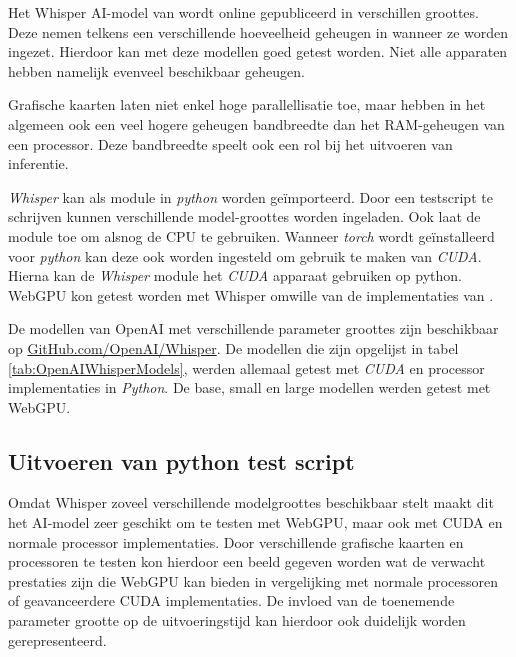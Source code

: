 Het Whisper AI-model van \textcite{OpenAI2023} wordt online gepubliceerd in verschillen groottes. Deze nemen telkens een verschillende hoeveelheid geheugen in wanneer ze worden ingezet. Hierdoor kan met deze modellen goed getest worden. Niet alle apparaten hebben namelijk evenveel beschikbaar geheugen. 

\bigbreak{}

Grafische kaarten laten niet enkel hoge parallellisatie toe, maar hebben in het algemeen ook een veel hogere geheugen bandbreedte dan het RAM-geheugen van een processor. Deze bandbreedte speelt ook een rol bij het uitvoeren van inferentie.

\bigbreak{}

\textit{Whisper} kan als module in \textit{python} worden geïmporteerd. Door een testscript te schrijven kunnen verschillende model-groottes worden ingeladen. Ook laat de module toe om alsnog de CPU te gebruiken. Wanneer \textit{torch} wordt geïnstalleerd voor \textit{python} kan deze ook worden ingesteld om gebruik te maken van \textit{CUDA}. Hierna kan de \textit{Whisper} module het \textit{CUDA} apparaat gebruiken op python. WebGPU kon getest worden met Whisper omwille van de implementaties van \textcite{Fleetwood2024, Fleetwood2023b}.

\bigbreak{}

De modellen van OpenAI met verschillende parameter groottes zijn beschikbaar op \href{https://github.com/openai/whisper}{GitHub.com/OpenAI/Whisper}. De modellen die zijn opgelijst in tabel \ref{tab:OpenAIWhisperModels}, werden allemaal getest met \textit{CUDA} en processor implementaties in \textit{Python}. De base, small en large modellen werden getest met WebGPU.

\break{}

\subsection*{Uitvoeren van python test script}

Omdat Whisper zoveel verschillende modelgroottes beschikbaar stelt maakt dit het AI-model zeer geschikt om te testen met WebGPU, maar ook met CUDA en normale processor implementaties. Door verschillende grafische kaarten en processoren te testen kon hierdoor een beeld gegeven worden wat de verwacht prestaties zijn die WebGPU kan bieden in vergelijking met normale processoren of geavanceerdere CUDA implementaties. De invloed van de toenemende parameter grootte op de uitvoeringstijd kan hierdoor ook duidelijk worden gerepresenteerd.

